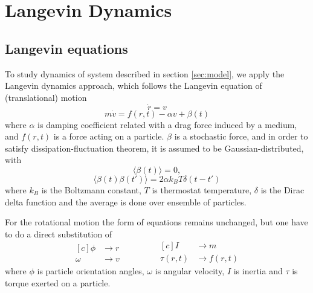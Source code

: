 \section{Langevin Dynamics}
\label{sec:langevin_dynamics}

\subsection{Langevin equations}
\label{subsec:langevin_equations}
To study dynamics of system described in section \ref{sec:model}, we apply the Langevin dynamics approach, which follows the Langevin equation of (translational) motion
\begin{equation}
\label{eq:langevin_theory_1}
	\dot{r} = v
\end{equation}
\begin{equation}
\label{eq:langevin_theory_2}
	m \dot{v} = f(r, t) - \alpha v + \beta(t)
\end{equation}
where $\alpha$ is damping coefficient related with a drag force induced by a medium, and $f(r, t)$ is a force acting on a particle. $\beta$ is a stochastic force, and in order to satisfy dissipation-fluctuation theorem, it is assumed to be Gaussian-distributed, with
\begin{equation}
\langle\beta(t)\rangle = 0,
\end{equation}
\begin{equation}
\label{eq:stochastic_term_dispersion}
\langle\beta(t)\beta(t')\rangle = 2 \alpha k_B T\delta(t - t')
\end{equation}
where $k_B$ is the Boltzmann constant, $T$ is thermostat temperature, $\delta$ is the Dirac delta function and the average is done over ensemble of particles.

For the rotational motion the form of equations remains unchanged, but one have to do a direct substitution of 
\begin{equation}
\label{eq:rotation_translation_substitution}
	\begin{aligned}[c]
		\phi &\rightarrow r        \\
		\omega &\rightarrow v 
	\end{aligned}
	\qquad
	\qquad
	\begin{aligned}[c]
		I &\rightarrow m        \\
		\tau(r, t) &\rightarrow f(r, t)
	\end{aligned}
\end{equation}
where $\phi$ is particle orientation angles, $\omega$ is angular velocity, $I$ is inertia and $\tau$ is torque exerted on a particle.

